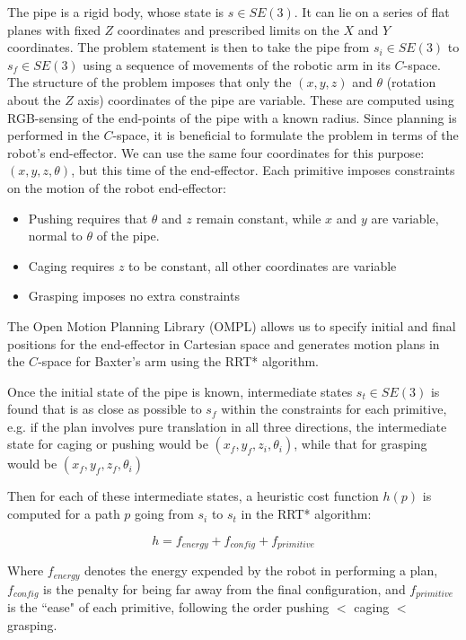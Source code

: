 \documentclass[runningheads,letterpaper]{llncs}
\begin{document}
The pipe is a rigid body, whose state is $s \in SE(3)$. It can lie on a series of flat planes with fixed $Z$ coordinates and prescribed limits on the $X$ and $Y$ coordinates. The problem statement is then to take the pipe from $s_i \in SE(3)$ to $s_f \in SE(3)$ using a sequence of movements of the robotic arm in its $C$-space. The structure of the problem imposes that only the $(x,y,z)$ and $\theta$ (rotation about the $Z$ axis) coordinates of the pipe are variable. These are computed using RGB-sensing of the end-points of the pipe with a known radius. Since planning is performed in the $C$-space, it is beneficial to formulate the problem in terms of the robot's end-effector. We can use the same four coordinates for this purpose: $(x,y,z,\theta)$, but this time of the end-effector. Each primitive imposes constraints on the motion of the robot end-effector:

\begin{itemize}
\item Pushing requires that $\theta$ and $z$ remain constant, while $x$ and $y$ are variable, normal to $\theta$ of the pipe.
\item Caging requires $z$ to be constant, all other coordinates are variable
\item Grasping imposes no extra constraints
\end{itemize} 

The Open Motion Planning Library (OMPL) allows us to specify initial and final positions for the end-effector in Cartesian space and generates motion plans in the $C$-space for Baxter's arm using the RRT* algorithm. 

Once the initial state of the pipe is known, intermediate states $s_t \in SE(3)$ is found that is as close as possible to $s_f$ within the constraints for each primitive, e.g. if the plan involves pure translation in all three directions, the intermediate state for caging or pushing would be $(x_f,y_f,z_i,\theta_i)$, while that for grasping would be $(x_f,y_f,z_f,\theta_i)$ 

Then for each of these intermediate states, a heuristic cost function $h(p)$ is computed for a path $p$ going from $s_i$ to $s_t$ in the RRT* algorithm:

\begin{equation}
h = f_{energy} + f_{config} + f_{primitive}
\end{equation}\label{eq:heuristic}

Where $f_{energy}$ denotes the energy expended by the robot in performing a plan, $f_{config}$ is the penalty for being far away from the final configuration, and $f_{primitive}$ is the ``ease" of each primitive, following the order pushing $<$ caging $<$ grasping.
\end{document}
